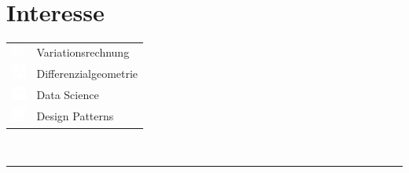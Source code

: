 \documentclass[onside]{article}
\begin{document}
{\begin{minipage}[t][\dimexpr\textheight-2\fboxrule-2\fboxsep\relax][t]{\dimexpr0.4\textwidth-2\fboxrule-2\fboxsep\relax}
        \section*{\large Interesse}
        \begin{tabular}{cl}
            \includegraphics[width=1.25em]{square-root-variable-solid} & Variationsrechnung \\
            \includegraphics[width=1.25em]{geometry_1} & Differenzialgeometrie \\
            \includegraphics[width=1.25em]{chart-line-solid} & Data Science \\
            \includegraphics[width=1.25em]{rangoli} & Design Patterns \\
        \end{tabular}
        \vspace{.3cm}
        \\
        \rule{\linewidth}{0.4pt}
        \\

\end{minipage}}
\end{document}
